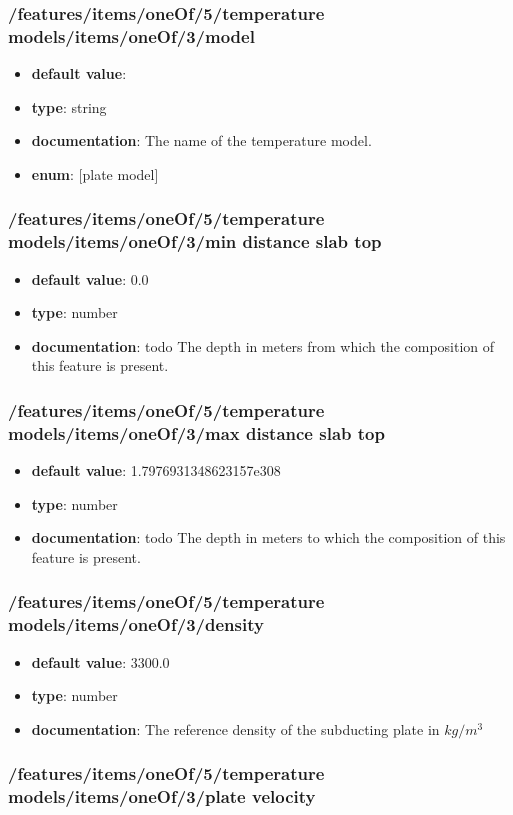 \subsubsection{/features/items/oneOf/5/temperature models/items/oneOf/3/model}
\begin{itemize}\item {\bf default value}: 
\item {\bf type}: string
\item {\bf documentation}: The name of the temperature model.
\item {\bf enum}: [plate model]\end{itemize}\subsubsection{/features/items/oneOf/5/temperature models/items/oneOf/3/min distance slab top}
\begin{itemize}\item {\bf default value}: 0.0
\item {\bf type}: number
\item {\bf documentation}: todo The depth in meters from which the composition of this feature is present.
\end{itemize}\subsubsection{/features/items/oneOf/5/temperature models/items/oneOf/3/max distance slab top}
\begin{itemize}\item {\bf default value}: 1.7976931348623157e308
\item {\bf type}: number
\item {\bf documentation}: todo The depth in meters to which the composition of this feature is present.
\end{itemize}\subsubsection{/features/items/oneOf/5/temperature models/items/oneOf/3/density}
\begin{itemize}\item {\bf default value}: 3300.0
\item {\bf type}: number
\item {\bf documentation}: The reference density of the subducting plate in $kg/m^3$
\end{itemize}\subsubsection{/features/items/oneOf/5/temperature models/items/oneOf/3/plate velocity}
